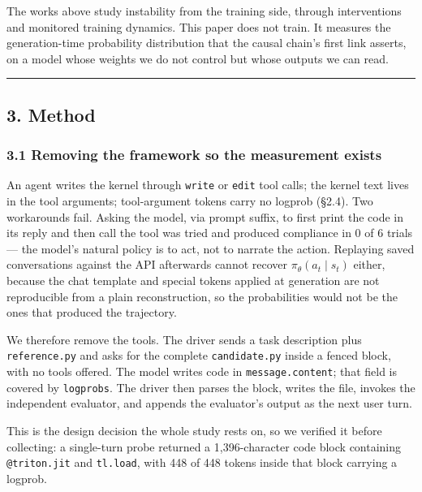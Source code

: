 \documentclass[
  11pt,
]{article}
\begin{document}
The works above study instability from the training side, through
interventions and monitored training dynamics. This paper does not
train. It measures the generation-time probability distribution that the
causal chain's first link asserts, on a model whose weights we do not
control but whose outputs we can read.

\begin{center}\rule{0.5\linewidth}{0.5pt}\end{center}

\hypertarget{method}{%
\subsection{3. Method}\label{method}}

\hypertarget{removing-the-framework-so-the-measurement-exists}{%
\subsubsection{3.1 Removing the framework so the measurement
exists}\label{removing-the-framework-so-the-measurement-exists}}

An agent writes the kernel through \texttt{write} or \texttt{edit} tool
calls; the kernel text lives in the tool arguments; tool-argument tokens
carry no logprob (§2.4). Two workarounds fail. Asking the model, via
prompt suffix, to first print the code in its reply and then call the
tool was tried and produced compliance in 0 of 6 trials --- the model's
natural policy is to act, not to narrate the action. Replaying saved
conversations against the API afterwards cannot recover
\(\pi_\theta(a_t \mid s_t)\) either, because the chat template and
special tokens applied at generation are not reproducible from a plain
reconstruction, so the probabilities would not be the ones that produced
the trajectory.

We therefore remove the tools. The driver sends a task description plus
\texttt{reference.py} and asks for the complete \texttt{candidate.py}
inside a fenced block, with no tools offered. The model writes code in
\texttt{message.content}; that field is covered by \texttt{logprobs}.
The driver then parses the block, writes the file, invokes the
independent evaluator, and appends the evaluator's output as the next
user turn.

This is the design decision the whole study rests on, so we verified it
before collecting: a single-turn probe returned a 1,396-character code
block containing \texttt{@triton.jit} and \texttt{tl.load}, with 448 of
448 tokens inside that block carrying a logprob.
\end{document}
